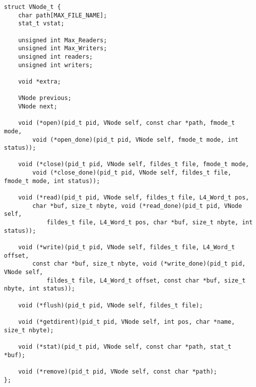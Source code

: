 \documentclass[12pt,english]{article}
\begin{document}
\begin{verbatim}
struct VNode_t {
    char path[MAX_FILE_NAME];
    stat_t vstat;
    
    unsigned int Max_Readers;
    unsigned int Max_Writers;
    unsigned int readers;
    unsigned int writers;
    
    void *extra; 
    
    VNode previous;
    VNode next;
    
    void (*open)(pid_t pid, VNode self, const char *path, fmode_t mode,
        void (*open_done)(pid_t pid, VNode self, fmode_t mode, int status));
    
    void (*close)(pid_t pid, VNode self, fildes_t file, fmode_t mode,
        void (*close_done)(pid_t pid, VNode self, fildes_t file, fmode_t mode, int status));
    
    void (*read)(pid_t pid, VNode self, fildes_t file, L4_Word_t pos,
        char *buf, size_t nbyte, void (*read_done)(pid_t pid, VNode self,
            fildes_t file, L4_Word_t pos, char *buf, size_t nbyte, int status));
    
    void (*write)(pid_t pid, VNode self, fildes_t file, L4_Word_t offset,
        const char *buf, size_t nbyte, void (*write_done)(pid_t pid, VNode self,
            fildes_t file, L4_Word_t offset, const char *buf, size_t nbyte, int status));
    
    void (*flush)(pid_t pid, VNode self, fildes_t file);
    
    void (*getdirent)(pid_t pid, VNode self, int pos, char *name, size_t nbyte);
    
    void (*stat)(pid_t pid, VNode self, const char *path, stat_t *buf);
    
    void (*remove)(pid_t pid, VNode self, const char *path);
};
\end{verbatim}
\end{document}
